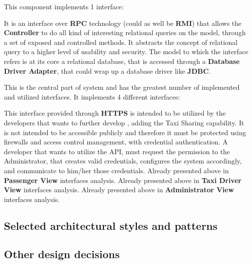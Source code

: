 \begin{itemize}
\begin{itemize}
	\end{itemize}
	This component implements 1 interface:
	\begin{itemize}
		 It is an interface over \textbf{RPC} technology (could as well be \textbf{RMI}) that allows the \textbf{Controller} to do all kind of interesting relational queries on the \myTaxiService{} model, through a set of exposed and controlled methods.
		It abstracts the concept of relational query to a higher level of usability and security.
		The model to which the interface refers is at its core a relational database, that is accessed through a \textbf{Database Driver Adapter}, that could wrap up a database driver like \textbf{JDBC}.
	\end{itemize}
	\itemBold{Controller}
	This is the central part of \myTaxiService{} system and has the greatest number of implemented and utilized interfaces.
	It implements 4 different interfaces:
	\begin{itemize}
		 This interface provided through \textbf{HTTPS} is intended to be utilized by the developers that wants to further develop \myTaxiService{}, adding the Taxi Sharing capability.
		It is not intended to be accessible publicly and therefore it must be protected using firewalls and access control management, with credential authentication.
		A developer that wants to utilize the API, must request the permission to the Administrator, that creates valid credentials, configures the system accordingly, and communicate to him/her those credentials.
		 Already presented above in \textbf{Passenger View} interfaces analysis.
		 Already presented above in \textbf{Taxi Driver View} interfaces analysis.
		 Already presented above in \textbf{Administrator View} interfaces analysis.
	\end{itemize}
\end{itemize}
\subsection{Selected architectural styles and patterns}
\subsection{Other design decisions}